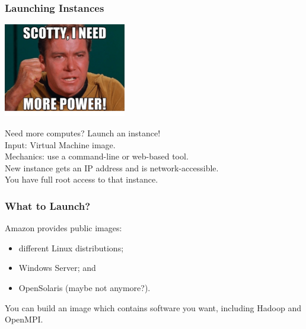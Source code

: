 \begin{frame}
  \frametitle{Launching Instances}
  
  \begin{center}
	\includegraphics[width=0.4\textwidth]{images/kirk.png}
\end{center}

  
Need more computes? Launch an instance!\\[1em]

Input: Virtual Machine image.\\[1em]

Mechanics: use a command-line or web-based tool.\\[1em]

New instance gets an IP address and is network-accessible. \\
You have full root access to that instance.
  
\end{frame}

\begin{frame}
  \frametitle{What to Launch?}

  
Amazon provides public images:
\begin{itemize}
\item different Linux distributions;
\item Windows Server; and
\item OpenSolaris (maybe not anymore?). 
\end{itemize}

You can build an image which contains software you
want, including Hadoop and OpenMPI.
  
\end{frame}

